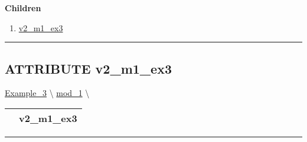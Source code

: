 \par


\textbf{Children}
\begin{enumerate}
\item \hyperlink{ecldoc:inintest.example_3.mod_1.v2_m1_ex3}{v2\_m1\_ex3}
\end{enumerate}

\rule{\linewidth}{0.5pt}

\subsection*{\textsf{\colorbox{headtoc}{\color{white} ATTRIBUTE}
v2\_m1\_ex3}}

\hypertarget{ecldoc:inintest.example_3.mod_1.v2_m1_ex3}{}
\hspace{0pt} \hyperlink{ecldoc:Inintest.Example_3}{Example_3} \textbackslash 
\hspace{0pt} \hyperlink{ecldoc:Inintest.Example_3.mod_1}{mod_1} \textbackslash 

{\renewcommand{\arraystretch}{1.5}
\begin{tabularx}{\textwidth}{|>{\raggedright\arraybackslash}l|X|}
\hline
\hspace{0pt}\mytexttt{\color{red} } & \textbf{v2\_m1\_ex3} \\
\hline
\end{tabularx}
}

\par


\rule{\linewidth}{0.5pt}




